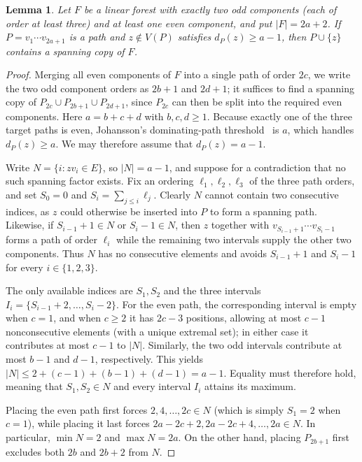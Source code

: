 \documentclass[10pt]{article}
\theoremstyle{compactplain}
\newtheorem{lemma}[theorem]{Lemma}
\theoremstyle{remark}\newtheorem{remark}[theorem]{Remark}
\begin{document}
\begin{lemma}\label{lem:path-completion}
Let $F$ be a linear forest with exactly two odd components (each of
order at least three) and at least one even component, and put
$|F|=2a+2$. If $P=v_1\cdots v_{2a+1}$ is a path and $z\notin V(P)$
satisfies $d_P(z)\ge a-1$, then $P\cup\{z\}$ contains a spanning copy of
$F$.
\end{lemma}
\begin{proof}
Merging all even components of $F$ into a single path of order $2c$, we
write the two odd component orders as $2b+1$ and $2d+1$; it suffices to
find a spanning copy of $P_{2c}\cup P_{2b+1}\cup P_{2d+1}$, since
$P_{2c}$ can then be split into the required even components. Here
$a=b+c+d$ with $b,c,d\ge1$. Because exactly one of the three target
paths is even, Johansson's dominating-path threshold~\cite[Lemma~2.2]{ChibaTsugaki}
is $a$, which handles $d_P(z)\ge a$. We may therefore assume that
$d_P(z)=a-1$.

Write $N=\{i:zv_i\in E\}$, so $|N|=a-1$, and suppose for a contradiction
that no such spanning factor exists. Fix an ordering
$\ell_1,\ell_2,\ell_3$ of the three path orders, and set $S_0=0$ and
$S_i=\sum_{j\le i}\ell_j$. Clearly $N$ cannot contain two consecutive
indices, as $z$ could otherwise be inserted into $P$ to form a spanning
path. Likewise, if $S_{i-1}+1\in N$ or $S_i-1\in N$, then $z$ together
with $v_{S_{i-1}+1}\cdots v_{S_i-1}$ forms a path of order $\ell_i$
while the remaining two intervals supply the other two components. Thus
$N$ has no consecutive elements and avoids $S_{i-1}+1$ and $S_i-1$ for
every $i\in\{1,2,3\}$.

The only available indices are $S_1,S_2$ and the three intervals
$I_i=\{S_{i-1}+2,\ldots,S_i-2\}$. For the even path, the corresponding
interval is empty when $c=1$, and when $c\ge2$ it has $2c-3$ positions,
allowing at most $c-1$ nonconsecutive elements (with a unique extremal
set); in either case it contributes at most $c-1$ to $|N|$. Similarly,
the two odd intervals contribute at most $b-1$ and $d-1$, respectively.
This yields $|N|\le2+(c-1)+(b-1)+(d-1)=a-1$. Equality must therefore
hold, meaning that $S_1,S_2\in N$ and every interval $I_i$ attains its
maximum.

Placing the even path first forces $2,4,\ldots,2c\in N$ (which is simply
$S_1=2$ when $c=1$), while placing it last forces
$2a-2c+2,2a-2c+4,\ldots,2a\in N$. In particular, $\min N=2$ and
$\max N=2a$. On the other hand, placing $P_{2b+1}$ first excludes both
$2b$ and $2b+2$ from $N$.


\end{proof}
\end{document}
